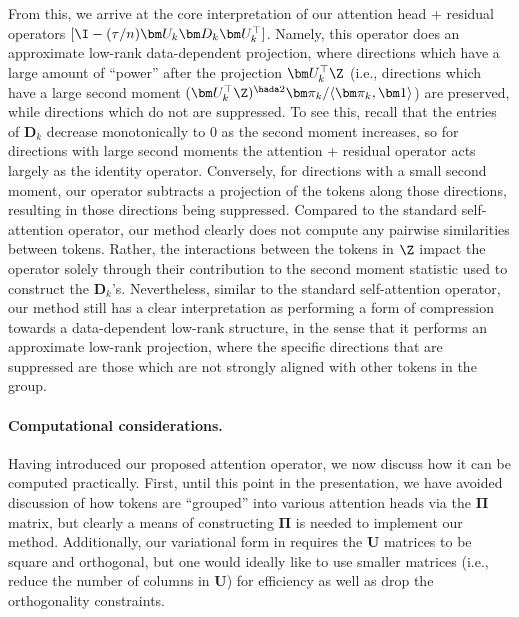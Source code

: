 \documentclass[../../book-main.tex]{subfiles}
\begin{document}
From this, we arrive at the core interpretation of our attention head + residual
operators $[\I - (\tau/n)\bm U_{k}\bm D_{k}\bm U_{k}^{\top}]$.  Namely, this
operator does an approximate low-rank data-dependent projection, where
directions which have a large amount of ``power'' after the projection $\bm
U_k^\top \Z$ (i.e., directions which have a large second moment $(\bm
    U_{k}^{\top}\Z)^{\hada 2}\bm \pi_k / \langle \bm \pi_{k}, \bm
1\rangle$) are preserved, while directions which do not are
suppressed. To see this, recall that the entries of $\bm D_k$
decrease monotonically to 0 as the second moment increases, so for
directions with large second moments the attention + residual
operator acts largely as the identity operator.  Conversely, for
directions with a small second moment, our operator subtracts a
projection of the tokens along those directions, resulting in those
directions being suppressed. Compared to the standard self-attention
operator, our method clearly does not compute any pairwise
similarities between tokens. Rather, the interactions between the
tokens in $\Z$ impact the operator solely through their contribution
to the second moment statistic used to construct the $\bm D_{k}$'s.
Nevertheless, similar to the standard self-attention operator, our
method still has a clear interpretation as performing a form of
compression towards a data-dependent low-rank structure, in the sense
that it performs an approximate low-rank projection, where the
specific directions that are suppressed are those which are not
strongly aligned with other tokens in the group.

\paragraph{Computational considerations.} Having introduced our
proposed attention operator, we now discuss how it can be computed
practically. First, until this point in the presentation, we have
avoided discussion of how tokens are ``grouped'' into various
attention heads via the $\bm\Pi$ matrix, but clearly a means of
constructing $\bm\Pi$ is needed to implement our method.
Additionally, our variational form in  requires
the $\bm U$ matrices to be square and orthogonal, but one would
ideally like to use smaller matrices (i.e., reduce the number of
columns in $\bm U$) for efficiency as well as drop the orthogonality
constraints.
\end{document}
